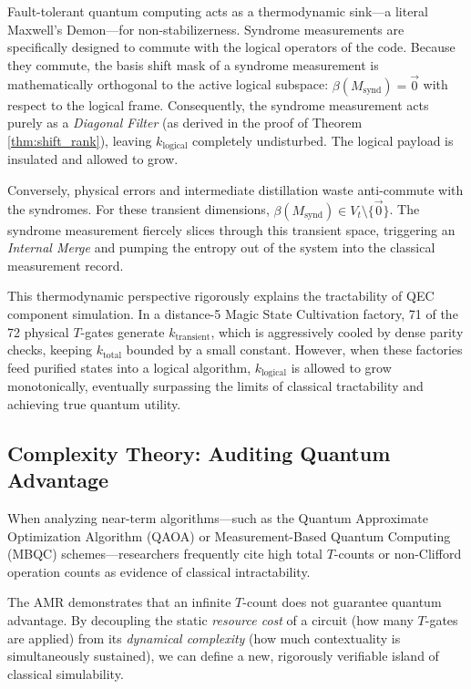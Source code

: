 \documentclass[aps,prx,reprint,superscriptaddress,nofootinbib]{revtex4-2}
\theoremstyle{definition}
\begin{document}
Fault-tolerant quantum computing acts as a thermodynamic sink—a literal Maxwell's Demon—for non-stabilizerness. Syndrome measurements are specifically designed to commute with the logical operators of the code. Because they commute, the basis shift mask of a syndrome measurement is mathematically orthogonal to the active logical subspace: $\beta(M_{\text{synd}}) = \vec{0}$ with respect to the logical frame. Consequently, the syndrome measurement acts purely as a \textit{Diagonal Filter} (as derived in the proof of Theorem \ref{thm:shift_rank}), leaving $k_{\text{logical}}$ completely undisturbed. The logical payload is insulated and allowed to grow.

Conversely, physical errors and intermediate distillation waste anti-commute with the syndromes. For these transient dimensions, $\beta(M_{\text{synd}}) \in V_t \setminus \{\vec{0}\}$. The syndrome measurement fiercely slices through this transient space, triggering an \textit{Internal Merge} and pumping the entropy out of the system into the classical measurement record.

This thermodynamic perspective rigorously explains the tractability of QEC component simulation. In a distance-5 Magic State Cultivation factory, 71 of the 72 physical $T$-gates generate $k_{\text{transient}}$, which is aggressively cooled by dense parity checks, keeping $k_{\text{total}}$ bounded by a small constant. However, when these factories feed purified states into a logical algorithm, $k_{\text{logical}}$ is allowed to grow monotonically, eventually surpassing the limits of classical tractability and achieving true quantum utility.

\subsection{Complexity Theory: Auditing Quantum Advantage}

When analyzing near-term algorithms—such as the Quantum Approximate Optimization Algorithm (QAOA) or Measurement-Based Quantum Computing (MBQC) schemes—researchers frequently cite high total $T$-counts or non-Clifford operation counts as evidence of classical intractability.

The AMR demonstrates that an infinite $T$-count does not guarantee quantum advantage. By decoupling the static \textit{resource cost} of a circuit (how many $T$-gates are applied) from its \textit{dynamical complexity} (how much contextuality is simultaneously sustained), we can define a new, rigorously verifiable island of classical simulability.
\end{document}
